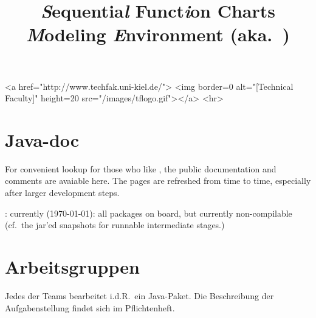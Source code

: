 \documentclass[11pt,german]{article}
\title{{\huge\bf \textsl{S}equentia\textsl{l} Funct\textsl{i}on Charts
    \textsl{M}odeling \textsl{E}nvironment (aka.\ \Slime)}}
\date{}
\begin{document}
\vspace{-2cm}



\begin{rawhtml}
<a href="http://www.techfak.uni-kiel.de/">
  <img border=0 alt="[Technical Faculty]" height=20  src="/images/tflogo.gif"></a>
<hr>
\end{rawhtml}


\maketitle{}






\section*{Java-doc}
\label{sec:javadoc}
\label{sec:html-doc}



For convenient lookup for those who like \javadoc, the public documentation
and comments are avaiable here. The pages are refreshed from time to time,
especially after larger development steps.

\begin{center}
  : currently (\today): all
  packages on board, but currently non-compilable (cf.\ the jar'ed
  snapshots for runnable intermediate stages.)
\end{center}

















\section*{Arbeitsgruppen}
\label{sec:gruppen}

Jedes der Teams bearbeitet i.d.R.\ ein Java-Paket. Die Beschreibung der
Aufgabenstellung findet sich im Pflichtenheft.
\end{document}
